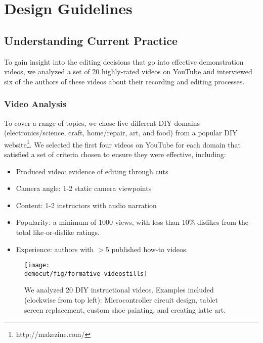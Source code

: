 
\section{Design Guidelines}
\label{democut_formative_study}

\subsection{Understanding Current Practice}
To gain insight into the editing decisions that go into effective
demonstration videos, we analyzed a set of 20 highly-rated videos
on YouTube and interviewed six of the authors of these videos about
their recording and editing processes.

\subsubsection{Video Analysis}
To cover a range of topics, we chose
five different DIY domains (electronics/science,
  craft, home/repair, art, and food) from a popular DIY website\footnote{http://makezine.com/}. We selected the first four videos on YouTube for each domain that satisfied a set of criteria chosen to ensure they were effective, including:

\begin{itemize}
  \setlength{\itemsep}{0pt}
  \item Produced video: evidence of editing through cuts %
  \item Camera angle: 1-2 static camera viewpoints %
  \item Content: 1-2 instructors with audio narration
  \item Popularity: a minimum of 1000 views, with less than 10\% dislikes from the total like-or-dislike ratings.
  \item Experience: authors with $>$5 published how-to videos.
\end{itemize}

\begin{figure}[t]
  \centering
\texttt{[image: \\democut/fig/formative-videostills]}
  \caption{We analyzed 20 DIY instructional videos. Examples included (clockwise from top left): Microcontroller circuit design, tablet screen replacement, custom shoe painting, and creating latte art.}
  \label{fig:formative}
  \vspace{-0.25in}
\end{figure}

